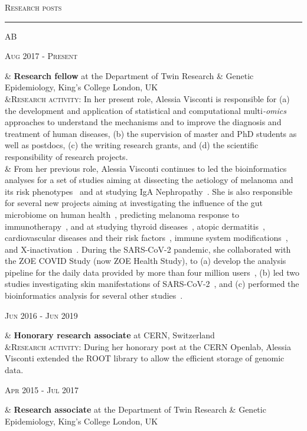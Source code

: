\documentclass[a4paper,10pt]{article}
\newcommand{\mediumtitle}[1]{
	\vspace{0.2cm}
	{\noindent
	\Large \textsc{#1}\\[-2ex]
	\hrule
	\vspace{0.2cm}}
}
\newenvironment{doubletablelist}
{
	\vspace{-0.2cm}
	\begin{longtable}[!h]{AB}}{\end{longtable}
}
\newcommand{\dtlist}[2]{
\hspace{-3cm}
\noindent
	\begin{minipage}{0.22\textwidth}
	\begin{flushright}
	\textsc{#1}
	\end{flushright}
	\end{minipage}
	& #2\\[0.2cm]
}
\begin{document}
\mediumtitle{Research posts}
\begin{doubletablelist}
    \dtlist{Aug 2017 - Present}{\textbf{Research fellow} at the Department of Twin Research \& Genetic Epidemiology, King's College London, UK \\	
	 &\textsc{Research activity}: In her present role, Alessia Visconti is responsible for (a) the development and application of statistical and computational multi\emph{-omics} approaches to understand the mechanisms and to improve the diagnosis and treatment of human diseases, (b) the supervision of master and PhD students as well as postdocs, (c) the writing research grants, and (d) the scientific responsibility of research projects.\\
	  & From her previous role, Alessia Visconti continues to led the bioinformatics analyses for a set of studies aiming at dissecting the aetiology of melanoma and its risk phenotypes~\cite{Vis19a,Vis20,Lan20,San20} and at studying IgA Nephropathy~\cite{Dot21}. She is also responsible for several new projects aiming at investigating the influence of the gut microbiome on human health~\cite{Vis19,Bar20,LeR22,Zha22,Val23,Lou23}, predicting melanoma response to immunotherapy~\cite{Ros22,Vis23}, and at studying thyroid diseases~\cite{Mar20}, atopic dermatitis~\cite{Gro21,Bud22}, cardiovascular diseases and their risk factors~\cite{Ros21}, immune system modifications~\cite{Pia21}, and X-inactivation~\cite{Zit23}. During the SARS-CoV-2 pandemic, she collaborated with the ZOE COVID Study (now ZOE Health Study), to (a) develop the analysis pipeline for the daily data provided by more than four million users~\cite{Mur21}, (b) led two studies investigating skin manifestations of SARS-CoV-2~\cite{Vis21, Vis22}, and (c) performed the bioinformatics analysis for several other studies~\cite{Men20,Lee20,Zaz20,Hop21,Wil21,Sud21}. %
	}
    \dtlist{Jun 2016 - Jun 2019}{\textbf{Honorary research associate} at CERN, Switzerland \\
	 &\textsc{Research activity}: During her honorary post at the CERN Openlab, Alessia Visconti extended the ROOT library %
	 to allow the efficient storage of genomic data.  %
	}
    \dtlist{Apr 2015 - Jul 2017}{\textbf{Research associate} at the Department of Twin Research \& Genetic Epidemiology, King's College London, UK \\ 
}
\end{doubletablelist}
\end{document}
